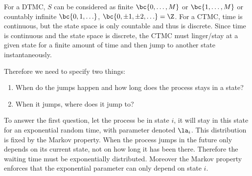 \documentclass{article}
\begin{document}
    For a DTMC, $S$ can be considered as finite $\bc{0, \ldots, M}$ or $\bc{1, \ldots, M}$ or countably infinite $\bc{0, 1, \ldots}$, $\bc{0, \pm 1, \pm 2, \ldots} = \Z$. For a CTMC, time is continuous, but the state space is only countable and thus is discrete. Since time is continuous and the state space is discrete, the CTMC must linger/stay at a given state for a finite amount of time and then jump to another state instantaneously.

    \begin{center}
    \end{center}

    Therefore we need to specify two things:
    \begin{enumerate}
        \item When do the jumps happen and how long does the process stays in a state?
        \item When it jumps, where does it jump to?
    \end{enumerate}
    To answer the first question, let the process be in state $i$, it will stay in this state for an exponential random time, with parameter denoted $\la_i$. This distribution is fixed by the Markov property. When the process jumps in the future only depends on its current state, not on how long it has been there. Therefore the waiting time must be exponentially distributed. Moreover the Markov property enforces that the exponential parameter can only depend on state $i$.
\end{document}
